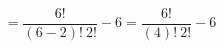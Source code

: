 \documentclass[preview]{standalone}
\begin{document}
\begin{center}
\[ = \frac{ \: 6! \: }{(6-2)! \: 2!} - 6 = \frac{ \: 6! \: }{(4)! \: 2!} - 6\]
\end{center}
\end{document}
